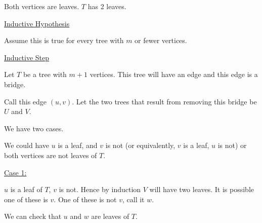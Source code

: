 \documentclass{article}
\begin{document}
Both vertices are leaves. $T$ has 2 leaves. 

\underline{Inductive Hypothesis}

Assume this is true for every tree with $m$ or fewer vertices. 

\underline{Inductive Step}

Let $T$ be a tree with $m+1$ vertices. This tree will have an edge and this edge is a bridge. 

Call this edge $(u,v)$. Let the two trees that result from removing this bridge be $U$ and $V$. 

\begin{center}
\end{center}

We have two cases. 

We could have $u$ is a leaf, and $v$ is not (or equivalently, $v$ is a leaf, $u$ is not) or both vertices are not leaves of $T$. 

\underline{Case 1:}

$u$ is a leaf of $T$, $v$ is not. Hence by induction $V$ will have two leaves. It is possible one of these is $v$. One of these is not $v$, call it $w$. 

We can check that $u$ and $w$ are leaves of $T$. 

\begin{center}
\end{center}
\end{document}
